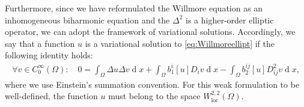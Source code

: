 \documentclass[12pt,a4paper,twoside]{article}
\newcommand{\diff}{\operatorname{d}\!}
\begin{document}
Furthermore, since we have reformulated the Willmore equation as an inhomogeneous biharmonic equation and the $\Delta^2$ is a higher-order elliptic operator, we can adopt the framework of variational solutions. Accordingly, we say that a function $u$ is a variational solution to \eqref{eq:Willmoreellipt} if the following identity holds:
\begin{align}
    \forall v\in C_0^\infty(\Omega): \quad 0= \int_\Omega \Delta u \Delta v \diff x +  \int_\Omega b^i_1[u]D_i v \diff x  -\int_{\Omega} b_2^{ij}[u]D ^2_{ij}  v \diff x, \label{eq:weakwillmore}
\end{align}
where we use Einstein's summation convention. For this weak formulation to be well-defined, the function $u$ must belong to the space  $W_\text{loc}^{2,2}(\Omega)$.

\end{document}
